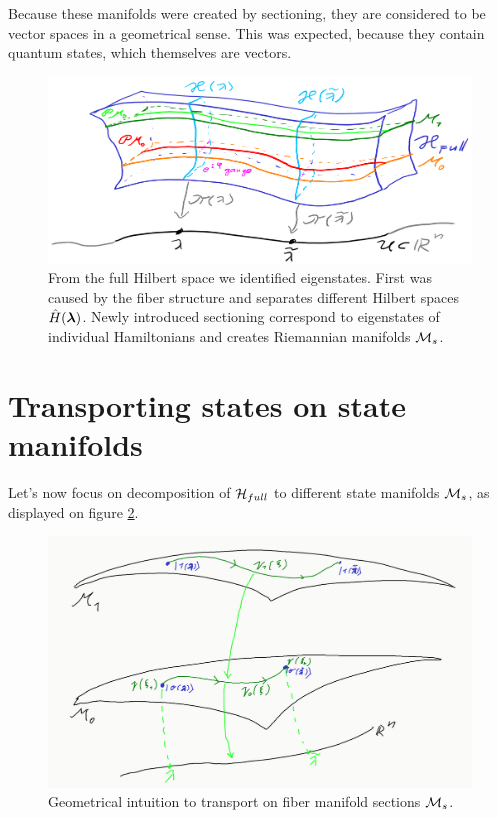 Because these manifolds were created by sectioning, they are considered to be vector spaces in a geometrical sense. This was expected, because they contain quantum states, which themselves are vectors. 

\begin{figure}[H]
    \centering
    \includegraphics[width=\textwidth]{../img/manifold_full_1.png}
\caption{From the full Hilbert space we identified eigenstates. First was caused by the fiber structure and separates different Hilbert spaces $\hat{H}({\bm\lambda})$. Newly introduced sectioning correspond to eigenstates of individual Hamiltonians and creates Riemannian manifolds $\mathcal{M}_s$.}
    \label{fig:fullStructure}
\end{figure}






\section{Transporting states on state manifolds}
Let's now focus on decomposition of $\mathcal{H}_{full}$ to different state manifolds $\mathcal{M}_s$, as displayed on figure \ref{fig:manifoldCutIntuition}.

\begin{figure}[h]
    \centering
    \includegraphics[width=\textwidth]{../img/manifoldCutIntuition.png}
\caption{Geometrical intuition to transport on fiber manifold sections $\mathcal{M}_s$.}
    \label{fig:manifoldCutIntuition}
\end{figure}

